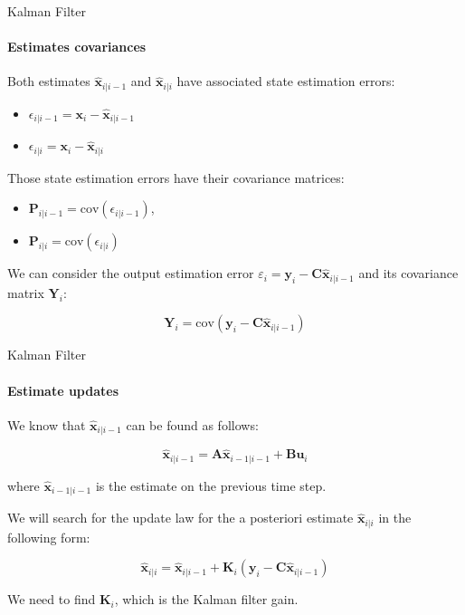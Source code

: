 \documentclass{beamer}
\begin{document}
\begin{frame}{Kalman Filter}
\framesubtitle{Estimates covariances}
\begin{flushleft}


Both estimates $\hat{\mathbf x}_{i|i-1}$ and $\hat{\mathbf x}_{i|i}$ have associated state estimation errors:

\begin{itemize}
    \item $\epsilon_{i|i-1} = \mathbf x_i - \hat{\mathbf x}_{i|i-1}$
    \item $\epsilon_{i|i} = \mathbf x_i - \hat{\mathbf x}_{i|i}$
\end{itemize}

\bigskip

Those state estimation errors have their covariance matrices:

\begin{itemize}
    \item $\mathbf P_{i|i-1} = \text{cov}(\epsilon_{i|i-1})$, 
    \item $\mathbf P_{i|i} = \text{cov}(\epsilon_{i|i})$
\end{itemize}

We can consider the output estimation error $\varepsilon_i = \mathbf y_i - \mathbf C \hat{\mathbf x}_{i|i-1}$ and its covariance matrix $\mathbf Y_i$: 

\[
\mathbf Y_i = \text{cov}(\mathbf y_i - \mathbf C \hat{\mathbf x}_{i|i-1})
\]

\end{flushleft}
\end{frame}



\begin{frame}{Kalman Filter}
\framesubtitle{Estimate updates}
\begin{flushleft}


We know that $\hat{\mathbf x}_{i|i-1}$ can be found as follows:

\[
\hat{\mathbf x}_{i|i-1} = \mathbf A \hat{\mathbf x}_{i-1|i-1} + \mathbf B \mathbf u_i
\]

where $\hat{\mathbf x}_{i-1|i-1}$ is the estimate on the previous time step.

\bigskip

We will search for the update law for the a posteriori estimate $\hat{\mathbf x}_{i|i}$ in the following form:

\[
\hat{\mathbf x}_{i|i} = \hat{\mathbf x}_{i|i-1} + 
\mathbf K_i (\mathbf y_i - \mathbf C \hat{\mathbf x}_{i|i-1})
\]

We need to find $\mathbf K_i$, which is the Kalman filter gain.


\end{flushleft}
\end{frame}
\end{document}
